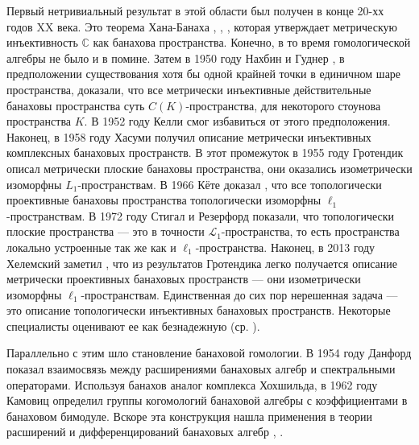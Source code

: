 Первый нетривиальный результат в этой области был получен в конце 20-хх годов XX века. Это теорема Хана-Банаха \cite{HahnLinSystInLinSp}, \cite{BanachOnLinFuncI}, \cite{BanachOnLinFuncII}, которая утверждает метрическую инъективность $\mathbb{C}$ как банахова пространства. Конечно, в то время гомологической алгебры не было и в помине. Затем в 1950 году Нахбин \cite{NachThOfHahnBanachType} и Гуднер \cite{GooProjInNorLinSp}, в предположении существования хотя бы одной крайней точки в единичном шаре пространства, доказали, что все метрически инъективные действительные банаховы пространства суть $C(K)$-пространства, для некоторого стоунова пространства $K$. В 1952 году Келли \cite{KellBanSpWithExtProp} смог избавиться от этого предположения. Наконец, в 1958 году Хасуми \cite{HasumiExtPropComplBanSp} получил описание метрически инъективных комплексных банаховых пространств. В этот промежуток в 1955 году Гротендик описал \cite{GrothMetrProjFlatBanSp} метрически плоские банаховы пространства, они оказались изометрически изоморфны $L_1$-пространствам. В 1966 Кёте доказал \cite{KotheTopProjBanSp}, что все топологически проективные банаховы пространства топологически изоморфны $\ell_1$-пространствам. В 1972 году Стигал и Резерфорд \cite{StegRethNucOpL1LInfSp} показали, что топологически плоские пространства --- это в точности $\mathscr{L}_1$-пространства, то есть пространства локально устроенные так же как и $\ell_1$-пространства. Наконец, в 2013 году Хелемский заметил \cite{HelMetrFrQMod}, что из результатов Гротендика легко получается описание метрически проективных банаховых пространств --- они изометрически изоморфны $\ell_1$-пространствам. Единственная до сих пор нерешенная задача --- это описание топологически инъективных банаховых пространств. Некоторые специалисты оценивают ее как безнадежную (ср. \cite{OnSepInjBanSp}).

Параллельно с этим шло становление банаховой гомологии. В 1954 году Данфорд \cite{DunfSpecOp} показал взаимосвязь между расширениями банаховых алгебр и спектральными операторами. Используя банахов аналог комплекса Хохшильда, в 1962 году Камовиц \cite{KamohomGrComBanAlg} определил группы когомологий банаховой алгебры с коэффициентами в банаховом бимодуле. Вскоре эта конструкция нашла применения в теории расширений и дифференцирований банаховых алгебр \cite{GuichardetHomolCohomolBanAlg}, \cite{JohnsonWeddebDecompBanAlgWithFinDimRad}. 

